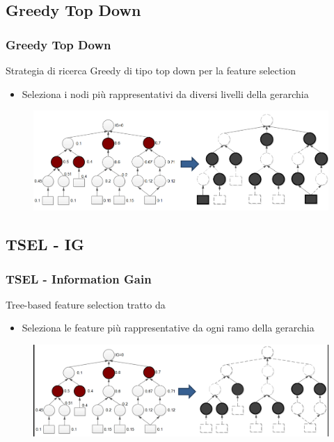 \documentclass{beamer}
\begin{document}
\subsection{Greedy Top Down}
\begin{frame}
	\frametitle{Greedy Top Down}
	Strategia di ricerca Greedy di tipo top down per la feature selection
	\begin{itemize}
		\item Seleziona i nodi più rappresentativi da diversi livelli della gerarchia
	\end{itemize}
	\begin{figure}[tbph]
		\centering
		\includegraphics[width=1\linewidth]{figure/Mannheim/Greedy_Top_Down.png}
		\label{fig:GreedyTopDown}
	\end{figure}
\end{frame}

\subsection{TSEL - IG}
\begin{frame}
	\frametitle{TSEL - Information Gain}
	Tree-based feature selection tratto da \cite{jeong2013feature}
	\begin{itemize}
		\item Seleziona le feature più rappresentative da ogni ramo della gerarchia
	\end{itemize}
	\begin{figure}[tbph]
		\centering
		\includegraphics[width=1\linewidth]{figure/Mannheim/TSEL.png}
		\label{fig:TSEL}
	\end{figure}
\end{frame}
\end{document}
